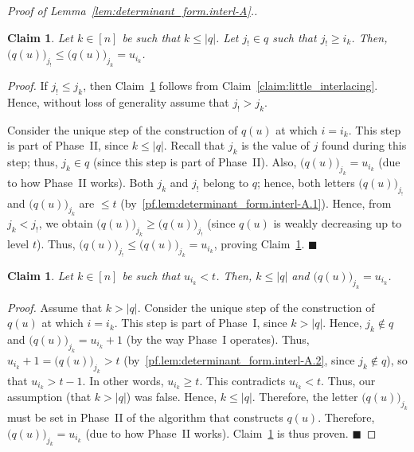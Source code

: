 \documentclass[reqno]{amsart}
\newcommand{\0}{\phantom{c}}
\newenvironment{subproof}{\textit{Proof.} }{\hfill$\blacksquare$\medskip}
\newcommand{\abs}[1]{\left| #1 \right|}
\newcommand{\ive}[1]{\left[ #1 \right]}
\theoremstyle{plain}
\newtheorem{claim}[thm]{Claim}
\theoremstyle{definition}
\numberwithin{equation}{section}
\begin{document}
\begin{proof}[Proof of Lemma~\ref{lem:determinant_form.interl-A}.]
\begin{claim}
\label{claim:smaller_site_jbang}
Let $k\in \ive{n} $ be such that $k \leq \abs{q}$.
Let $j_{!} \in q$ such that $j_{!} \geq i_k$.
Then, $\bigl( q(u) \bigr)_{j_{!}} \leq \bigl( q(u) \bigr)_{j_k} = u_{i_k}$.
\end{claim}

\begin{subproof}
If $j_{!}\leq j_k$, then Claim~\ref{claim:smaller_site_jbang} follows from Claim~\ref{claim:little_interlacing}.
Hence, without loss of generality assume that $j_{!} > j_k$.

Consider the unique step of the construction of $q(u) $ at which  $i=i_k$.
This step is part of Phase~II, since $k\leq \abs{q}$.
Recall that $j_k$ is the value of $j$ found during this step; thus, $j_k\in q$ (since this step is part of Phase~II). Also, $\bigl( q(u) \bigr)_{j_k} = u_{i_k}$ (due to how Phase~II works).
Both $j_k$ and $j_{!}$ belong to $q$; hence, both letters $\bigl( q(u) \bigr)_{j_{!}}$ and $\bigl( q(u) \bigr)_{j_k}$ are $\leq t$ (by~\eqref{pf.lem:determinant_form.interl-A.1}).
Hence, from $j_k < j_{!}$, we obtain $\bigl( q(u) \bigr)_{j_k} \geq \bigl( q(u) \bigr)_{j_{!}}$ (since $q(u)$ is weakly decreasing up to level $t$).
Thus, $\bigl( q(u) \bigr)_{j_{!}} \leq \bigl( q(u) \bigr)_{j_k} = u_{i_k}$, proving Claim~\ref{claim:smaller_site_jbang}.
\end{subproof}

\begin{claim}
\label{claim:pf.lem:determinant_form.interl-A.b.1}
Let $k\in \ive{n}$ be such that $u_{i_k} < t$. Then, $k \leq \abs{q}$ and $\bigl( q(u) \bigr)_{j_k} = u_{i_k}$.
\end{claim}

\begin{subproof}
Assume that $k > \abs{q}$.
Consider the unique step of the construction of $q(u)$ at which $i = i_k$.
This step is part of Phase~I, since $k > \abs{q}$.
Hence, $j_k \notin q$ and $\bigl( q(u) \bigr)_{j_k} = u_{i_k}+1$ (by the way Phase~I operates).
Thus, $u_{i_k}+1 = \bigl( q(u) \bigr)_{j_k} > t$ (by~\eqref{pf.lem:determinant_form.interl-A.2}, since $j_k\notin q$), so that $u_{i_k} > t-1$.
In other words, $u_{i_k} \geq t$.
This contradicts $u_{i_k} < t$.
Thus, our assumption (that $k > \abs{q}$) was false.
Hence, $k \leq \abs{q}$.
Therefore, the letter $\bigl( q(u) \bigr)_{j_k}$ must be set in Phase~II of the algorithm that constructs $q(u)$.
Therefore, $\bigl( q(u) \bigr)_{j_k} = u_{i_k}$ (due to how Phase~II works).
Claim~\ref{claim:pf.lem:determinant_form.interl-A.b.1} is thus proven.
\end{subproof}


\end{proof}
\end{document}
